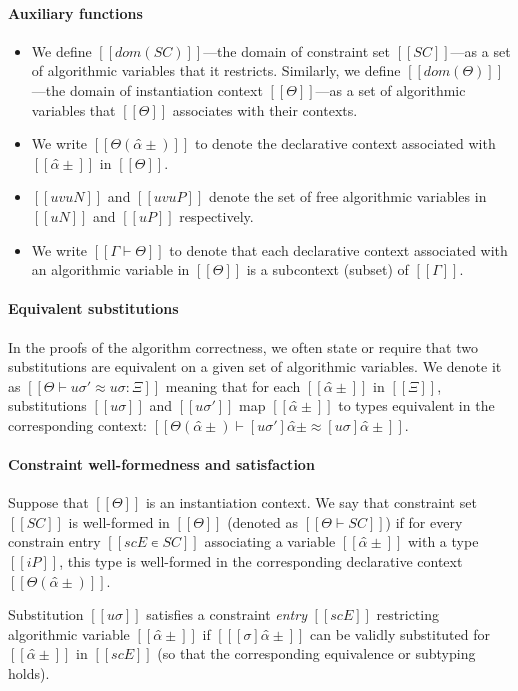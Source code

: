 \paragraph*{Auxiliary functions}
\begin{itemize}
  \item
    We define $[[dom(SC)]]$---the domain of constraint set $[[SC]]$---as a set of
    algorithmic variables that it restricts. Similarly, we define $[[dom(Θ)]]$---the
    domain of instantiation context $[[Θ]]$---as a set of algorithmic variables that
    $[[Θ]]$ associates with their contexts.  
  \item We write $[[Θ(α̂±)]]$ to denote the
    declarative context associated with $[[α̂±]]$ in $[[Θ]]$. 
  \item $[[uv uN]]$ and $[[uv uP]]$ denote the set of free algorithmic variables in $[[uN]]$ and
    $[[uP]]$ respectively.
  \item We write $[[Γ ⊢ Θ]]$ to denote that each
    declarative context associated with an algorithmic variable in $[[Θ]]$ is 
    a subcontext (subset) of $[[Γ]]$.
\end{itemize}

\paragraph*{Equivalent substitutions}
In the proofs of the algorithm correctness, 
we often state or require that two substitutions are equivalent
on a given set of algorithmic variables.
We denote it as $[[Θ ⊢ uσ' ≈ uσ : Ξ]]$ meaning that
for each $[[α̂±]]$ in $[[Ξ]]$, substitutions $[[uσ]]$ and $[[uσ']]$
map $[[α̂±]]$ to types equivalent in the corresponding context:
$[[ Θ(α̂±) ⊢ [uσ']α̂± ≈ [uσ]α̂± ]]$.



\paragraph*{Constraint well-formedness and satisfaction}
Suppose that $[[Θ]]$ is an instantiation context. 
We say that constraint set $[[SC]]$ is well-formed in $[[Θ]]$ 
(denoted as $[[Θ ⊢ SC]]$) 
if for every constrain entry $[[scE ∊ SC]]$
associating a variable $[[α̂±]]$ with a type $[[iP]]$,
this type is well-formed in the corresponding declarative context $[[Θ(α̂±)]]$.

Substitution $[[uσ]]$ satisfies a constraint \emph{entry} $[[scE]]$ restricting
algorithmic variable $[[α̂±]]$ if
$[[ [σ]α̂± ]]$ can be validly substituted for $[[α̂±]]$ in $[[scE]]$ 
(so that the corresponding equivalence or subtyping holds).

